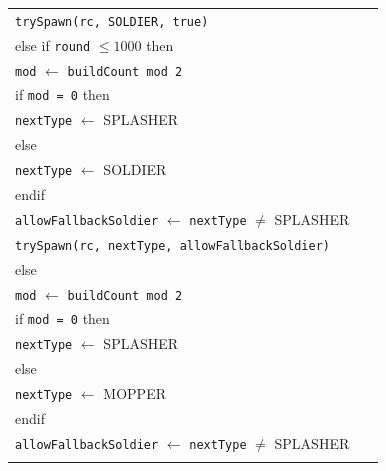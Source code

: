 \documentclass{article}
\newenvironment{pseudobox}
{
\centering
\begin{longtable}{|p{0.94\linewidth}|}
\hline
}
{
\\ \hline
\end{longtable}
\vspace{0.05cm}
}
\begin{document}
\begin{enumerate}[label=\alph*.]
\begin{pseudobox}
\hspace*{3em}\texttt{trySpawn(rc, SOLDIER, true)} \\

\hspace*{1.5em}else if \texttt{round} $\leq 1000$ then \\

\hspace*{3em}\texttt{mod} $\leftarrow$ \texttt{buildCount mod 2} \\

\hspace*{3em}if \texttt{mod = 0} then \\
\hspace*{4.5em}\texttt{nextType} $\leftarrow$ SPLASHER \\
\hspace*{3em}else \\
\hspace*{4.5em}\texttt{nextType} $\leftarrow$ SOLDIER \\
\hspace*{3em}endif \\

\hspace*{3em}\texttt{allowFallbackSoldier} $\leftarrow$ \texttt{nextType} $\neq$ SPLASHER \\

\hspace*{3em}\texttt{trySpawn(rc, nextType, allowFallbackSoldier)} \\

\hspace*{1.5em}else \\

\hspace*{3em}\texttt{mod} $\leftarrow$ \texttt{buildCount mod 2} \\

\hspace*{3em}if \texttt{mod = 0} then \\
\hspace*{4.5em}\texttt{nextType} $\leftarrow$ SPLASHER \\
\hspace*{3em}else \\
\hspace*{4.5em}\texttt{nextType} $\leftarrow$ MOPPER \\
\hspace*{3em}endif \\

\hspace*{3em}\texttt{allowFallbackSoldier} $\leftarrow$ \texttt{nextType} $\neq$ SPLASHER \\


\end{pseudobox}
\end{enumerate}
\end{document}
